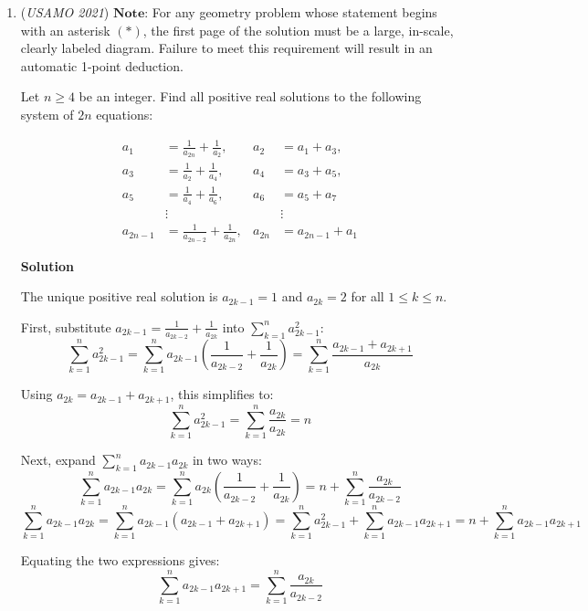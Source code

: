 \begin{enumerate}
 Given this information, find all possible values for the number of elements of $S$.


 


	\item (\textit{USAMO 2021}) $\textbf{Note:}$ For any geometry problem whose statement begins with an asterisk $(*)$, the first page of the solution must be a large, in-scale, clearly labeled diagram. Failure to meet this requirement will result in an automatic 1-point deduction.


 Let $n \geq 4$ be an integer. Find all positive real solutions to the following system of $2n$ equations:


 
 \begin{align*} a_{1} &=\frac{1}{a_{2 n}}+\frac{1}{a_{2}}, & a_{2}&=a_{1}+a_{3}, \\ a_{3}&=\frac{1}{a_{2}}+\frac{1}{a_{4}}, & a_{4}&=a_{3}+a_{5}, \\ a_{5}&=\frac{1}{a_{4}}+\frac{1}{a_{6}}, & a_{6}&=a_{5}+a_{7} \\ &\vdots & &\vdots \\ a_{2 n-1}&=\frac{1}{a_{2 n-2}}+\frac{1}{a_{2 n}}, & a_{2 n}&=a_{2 n-1}+a_{1} \end{align*}





\textbf{Solution}

The unique positive real solution is $a_{2k-1} = 1$ and $a_{2k} = 2$ for all $1 \le k \le n$.

 First, substitute $a_{2k-1} = \frac{1}{a_{2k-2}} + \frac{1}{a_{2k}}$ into $\sum_{k=1}^n a_{2k-1}^2$:
 \[\sum_{k=1}^n a_{2k-1}^2 = \sum_{k=1}^n a_{2k-1}\left(\frac{1}{a_{2k-2}} + \frac{1}{a_{2k}}\right) = \sum_{k=1}^n \frac{a_{2k-1} + a_{2k+1}}{a_{2k}}\]

 Using $a_{2k} = a_{2k-1} + a_{2k+1}$, this simplifies to:
 \[\sum_{k=1}^n a_{2k-1}^2 = \sum_{k=1}^n \frac{a_{2k}}{a_{2k}} = n\]

 Next, expand $\sum_{k=1}^n a_{2k-1} a_{2k}$ in two ways:
 \[\sum_{k=1}^n a_{2k-1} a_{2k} = \sum_{k=1}^n a_{2k}\left(\frac{1}{a_{2k-2}} + \frac{1}{a_{2k}}\right) = n + \sum_{k=1}^n \frac{a_{2k}}{a_{2k-2}}\]
 \[\sum_{k=1}^n a_{2k-1} a_{2k} = \sum_{k=1}^n a_{2k-1}(a_{2k-1} + a_{2k+1}) = \sum_{k=1}^n a_{2k-1}^2 + \sum_{k=1}^n a_{2k-1} a_{2k+1} = n + \sum_{k=1}^n a_{2k-1} a_{2k+1}\]

 Equating the two expressions gives:
 \[\sum_{k=1}^n a_{2k-1} a_{2k+1} = \sum_{k=1}^n \frac{a_{2k}}{a_{2k-2}}\]


\end{enumerate}
